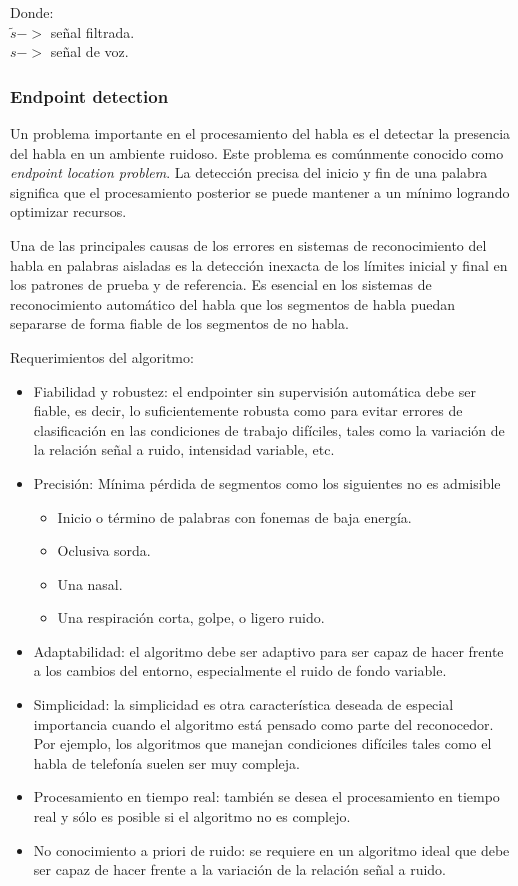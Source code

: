 Donde:
\\$\tilde{s}->$ señal filtrada.
\\$s->$ señal de voz.

\subsubsection{Endpoint detection}

Un problema importante en el procesamiento del habla es el detectar la presencia del habla en un ambiente ruidoso. Este problema es comúnmente conocido como \textit{endpoint location problem}. La detección precisa del inicio y fin de una palabra significa que el procesamiento posterior se puede mantener a un mínimo logrando optimizar recursos.

Una de las principales causas de los errores en sistemas de reconocimiento del habla en palabras aisladas es la detección inexacta de los límites inicial y final en los patrones de prueba y de referencia. Es esencial en los sistemas de reconocimiento automático del habla que los segmentos de habla puedan separarse de forma fiable de los segmentos de no habla.

Requerimientos del algoritmo:

\begin{itemize}
\item	Fiabilidad y robustez: el endpointer sin supervisión automática debe ser fiable, es decir, lo suficientemente robusta como para evitar errores de clasificación en las condiciones de trabajo difíciles, tales como la variación de la relación señal a ruido, intensidad variable, etc.
\item	Precisión: Mínima pérdida de segmentos como los siguientes no es admisible
\begin{itemize}
\item	Inicio o término de palabras con fonemas de baja energía.
\item	Oclusiva sorda.
\item	Una nasal.
\item	Una respiración corta, golpe, o ligero ruido.
\end{itemize}
\item	Adaptabilidad: el algoritmo debe ser adaptivo para ser capaz de hacer frente a los cambios del entorno, especialmente el ruido de fondo variable.
\item	Simplicidad: la simplicidad es otra característica deseada de especial importancia cuando el algoritmo está pensado como parte del reconocedor. Por ejemplo, los algoritmos que manejan condiciones difíciles tales como el habla de telefonía suelen ser muy compleja.
\item	Procesamiento en tiempo real: también se desea el procesamiento en tiempo real y sólo es posible si el algoritmo no es complejo.
\item	No conocimiento a priori de ruido: se requiere en un algoritmo ideal que debe ser capaz de hacer frente a la variación de la relación señal a ruido.
\end{itemize}

